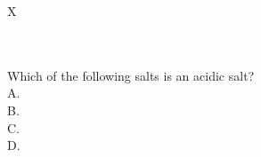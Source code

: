 \begin{xltabular}{\textwidth}{X}
    \caption{\textbf{Examples for each required skill considered in the \chembench corpus.} The table shows the number of questions for each skill and an example question. Note that the total count in this table is bigger than the \chembench corpus. This is because the same question can be annotated with two different skills, e.g., Reasoning and Calculation.}    
    \label{tab:chembench_corpus_cognitive} \\
            \toprule
             \\
            \midrule
            Which of the following salts is an acidic salt? \\
            A.  \\
            B.  \\
            C.  \\
            D.  \\
            \midrule
             \\
            \midrule

\end{xltabular}
